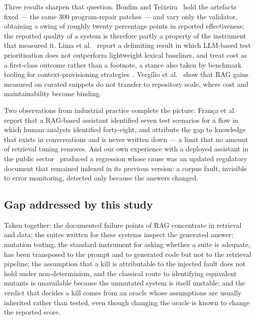 \documentclass[a4paper,fleqn]{cas-dc}
\begin{document}
Three results sharpen that question. Bonfim and
Teixeira~\cite{bonfim2026evaluator} hold the artefacts fixed --- the same 300
program-repair patches --- and vary only the validator, obtaining a swing of
roughly twenty percentage points in reported effectiveness; the reported
quality of a system is therefore partly a property of the instrument that
measured it. Lima et al.~\cite{lima2026limits} report a delimiting result in
which LLM-based test prioritisation does not outperform lightweight lexical
baselines, and treat cost as a first-class outcome rather than a footnote, a
stance also taken by benchmark tooling for context-provisioning
strategies~\cite{vasconcelos2026llmcontextbench}. Verg\'ilio et
al.~\cite{vergilio2026rag} show that RAG gains measured on curated snippets do
not transfer to repository scale, where cost and maintainability become
binding.

Two observations from industrial practice complete the picture. Fran\c{c}a et
al.~\cite{franca2026genai} report that a RAG-based assistant identified seven
test scenarios for a flow in which human analysts identified forty-eight, and
attribute the gap to knowledge that exists in conversations and is never
written down --- a limit that no amount of retrieval tuning removes. And our own
experience with a deployed assistant in the public
sector~\cite{oliveira2026sast} produced a regression whose cause was an updated
regulatory document that remained indexed in its previous version: a corpus
fault, invisible to error monitoring, detected only because the answers
changed.

\subsection{Gap addressed by this study}
\label{sec:gap}

Taken together: the documented failure points of RAG concentrate in retrieval
and data; the suites written for these systems inspect the generated answer;
mutation testing, the standard instrument for asking whether a suite is
adequate, has been transposed to the prompt and to generated code but not to
the retrieval pipeline; the assumption that a kill is attributable to the
injected fault does not hold under non-determinism, and the classical route to
identifying equivalent mutants is unavailable because the unmutated system is
itself unstable; and the verdict that decides a kill comes from an oracle whose
assumptions are usually inherited rather than tested, even though changing the
oracle is known to change the reported score.
\end{document}

